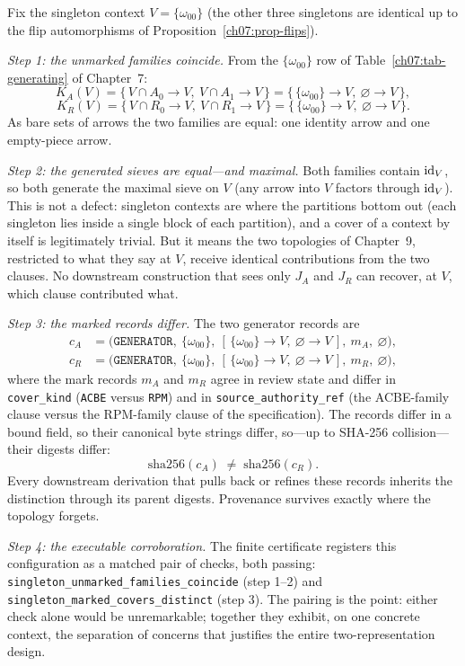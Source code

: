 \begin{example}\label{ch08:ex-singleton}
Fix the singleton context $V=\{\omega_{00}\}$ (the other three singletons are identical up to the flip automorphisms of Proposition~\ref{ch07:prop-flips}).

\emph{Step 1: the unmarked families coincide.} From the $\{\omega_{00}\}$ row of Table~\ref{ch07:tab-generating} of Chapter~7:
\[
K_{A}(V)=\bigl\{\,V\cap A_{0}\to V,\ V\cap A_{1}\to V\,\bigr\}
=\bigl\{\,\{\omega_{00}\}\to V,\ \varnothing\to V\,\bigr\},
\]
\[
K_{R}(V)=\bigl\{\,V\cap R_{0}\to V,\ V\cap R_{1}\to V\,\bigr\}
=\bigl\{\,\{\omega_{00}\}\to V,\ \varnothing\to V\,\bigr\}.
\]
As bare sets of arrows the two families are equal: one identity arrow and one empty-piece arrow.

\emph{Step 2: the generated sieves are equal---and maximal.} Both families contain $\mathrm{id}_{V}$, so both generate the maximal sieve on $V$ (any arrow into $V$ factors through $\mathrm{id}_{V}$). This is not a defect: singleton contexts are where the partitions bottom out (each singleton lies inside a single block of each partition), and a cover of a context by itself is legitimately trivial. But it means the two topologies of Chapter~9, restricted to what they say at $V$, receive identical contributions from the two clauses. No downstream construction that sees only $J_{A}$ and $J_{R}$ can recover, at $V$, which clause contributed what.

\emph{Step 3: the marked records differ.} The two generator records are
\begin{align*}
c_{A} &= \bigl(\texttt{GENERATOR},\ \{\omega_{00}\},\ [\,\{\omega_{00}\}\to V,\ \varnothing\to V\,],\ m_{A},\ \varnothing\bigr),\\
c_{R} &= \bigl(\texttt{GENERATOR},\ \{\omega_{00}\},\ [\,\{\omega_{00}\}\to V,\ \varnothing\to V\,],\ m_{R},\ \varnothing\bigr),
\end{align*}
where the mark records $m_{A}$ and $m_{R}$ agree in review state and differ in \texttt{cover\_kind} (\texttt{ACBE} versus \texttt{RPM}) and in \texttt{source\_authority\_ref} (the ACBE-family clause versus the RPM-family clause of the specification). The records differ in a bound field, so their canonical byte strings differ, so---up to SHA-256 collision---their digests differ:
\[
\mathrm{sha256}(c_{A})\;\neq\;\mathrm{sha256}(c_{R}).
\]
Every downstream derivation that pulls back or refines these records inherits the distinction through its parent digests. Provenance survives exactly where the topology forgets.

\emph{Step 4: the executable corroboration.} The finite certificate registers this configuration as a matched pair of checks, both passing: \texttt{singleton\_unmarked\_families\_coincide} (step 1--2) and \texttt{singleton\_marked\_covers\_distinct} (step 3). The pairing is the point: either check alone would be unremarkable; together they exhibit, on one concrete context, the separation of concerns that justifies the entire two-representation design.
\end{example}

